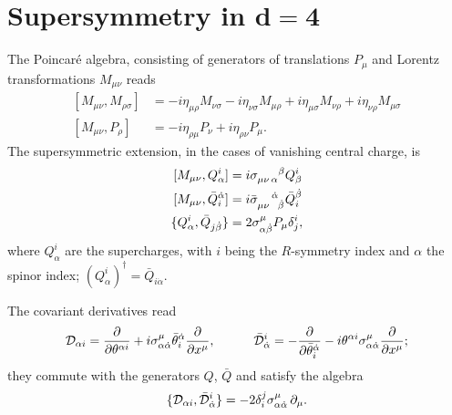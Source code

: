 \section[Supersymmetry in \texorpdfstring{${d=4}$}{{{d=4}}} ]{Supersymmetry in \texorpdfstring{$\boldsymbol{d=4}$}{{{d=4}}} }

The Poincar\'{e} algebra, consisting of generators of translations $P_\mu$ and Lorentz transformations $M_{\mu\nu}$  reads
\begin{align}
\label{susy1}
[M_{\mu\nu}, M_{\rho \sigma}] &= 
- i \eta_{\mu\rho} M_{\nu\sigma}
- i \eta_{\nu\sigma} M_{\mu\rho}
+ i \eta_{\mu\sigma} M_{\nu\rho}
+ i \eta_{\nu\rho} M_{\mu\sigma} 
\\
[M_{\mu\nu} , P_\rho]
&  =
-i \eta_{\rho\mu}  P_\nu + i \eta_{\rho\nu} P_\mu.
\end{align} 
The supersymmetric extension, in the cases of vanishing central charge, is
\begin{align}
\label{pedissequo0000}
[M_{\mu\nu}, Q^i_\alpha] 
& = i {\sigma}\indices{_{\mu\nu \, \alpha}^\beta} Q^i_\beta
\\
[M_{\mu\nu}, \bar{Q}_{i}^{\dot \alpha}] 
&  = i {\bar{\sigma}}%
\indices{_{\mu\nu \,} ^{\dot{\alpha}}_{\dot{\beta}}} \bar Q_{i}^{\dot{\beta}}
\\
\label{pedissequo}
\{Q^i_\alpha , \bar{Q}_{j \dot \beta} \} & = 2 \sigma^\mu_{\alpha \dot{\beta}}
P_\mu \delta^{i}_j,
\end{align}
where $Q^i_\alpha$ are the supercharges, with $i$ being the $R$-symmetry index and $\alpha$ the spinor index; $(Q^i_\alpha)^\dagger = \bar Q_{i\dot\alpha}$.

The covariant derivatives read
\begin{equation}
{ \mathcal{D} }_{\alpha i} = \frac{\partial}{\partial \theta^{\alpha i}}
+ i \sigma^\mu_{\alpha\dot\alpha} \bar\theta^{\dot \alpha}_i \frac{\partial}{\partial x^\mu},
\hspace{3em}
\bar {{ \mathcal{D} }}_{\dot \alpha}^i = - \frac{\partial}{\partial \bar{\theta}^{\dot \alpha}_i}
- i \theta^{\alpha i } \sigma^\mu_{\alpha \dot\alpha} \frac{\partial}{\partial x^\mu};
\end{equation}
they commute with the generators $Q$, $\bar Q$ and  satisfy the algebra
\begin{equation}
\{
{ \mathcal{D} }_{\alpha i},
\bar {{ \mathcal{D} }}_{\dot \alpha} ^ i\}
=
 - 2 \delta_i^j \sigma^\mu_{\alpha \dot \alpha} \, \partial_\mu.
\end{equation}


